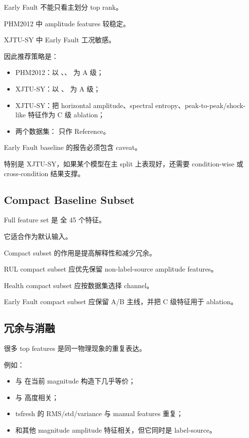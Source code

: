 Early Fault 不能只看主划分 top rank。

PHM2012 中 amplitude features 较稳定。

XJTU-SY 中 Early Fault 工况敏感。

因此推荐策略是：

\begin{itemize}[leftmargin=2em]
  \item PHM2012：以 、、 为 A 级；
  \item XJTU-SY：以 、 为 A 级；
  \item XJTU-SY：把 horizontal amplitude、spectral entropy、peak-to-peak/shock-like 特征作为 C 级 ablation；
  \item 两个数据集： 只作 Reference。
\end{itemize}

Early Fault baseline 的报告必须包含 caveat。

特别是 XJTU-SY，如果某个模型在主 split 上表现好，还需要 condition-wise 或 cross-condition 结果支撑。

\subsection{Compact Baseline Subset}



Full feature set 是  全 45 个特征。

它适合作为默认输入。

Compact subset 的作用是提高解释性和减少冗余。

RUL compact subset 应优先保留 non-label-source amplitude features。

Health compact subset 应按数据集选择 channel。

Early Fault compact subset 应保留 A/B 主线，并把 C 级特征用于 ablation。

\subsection{冗余与消融}

很多 top features 是同一物理现象的重复表达。

例如：

\begin{itemize}[leftmargin=2em]
  \item {} 与  在当前 magnitude 构造下几乎等价；
  \item {} 与  高度相关；
  \item tsfresh 的 RMS/std/variance 与 manual features 重复；
  \item {} 和其他 magnitude amplitude 特征相关，但它同时是 label-source。
\end{itemize}


